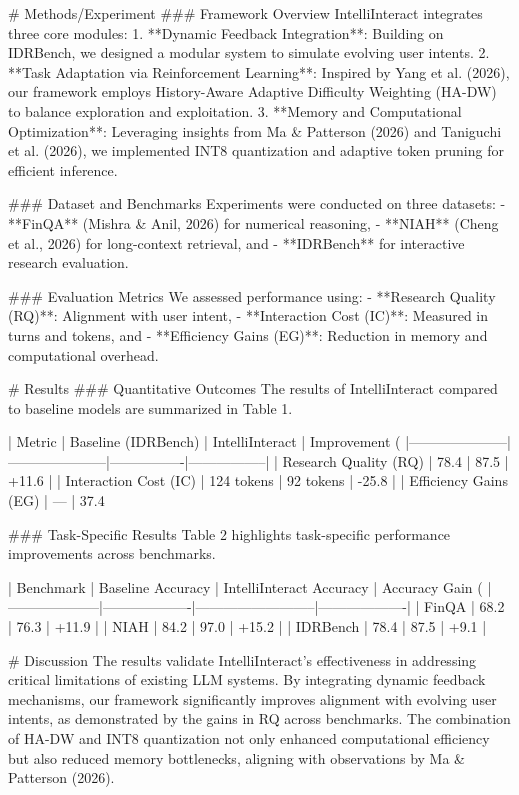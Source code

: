 # Methods/Experiment  
### Framework Overview  
IntelliInteract integrates three core modules:  
1. **Dynamic Feedback Integration**: Building on IDRBench, we designed a modular system to simulate evolving user intents.  
2. **Task Adaptation via Reinforcement Learning**: Inspired by Yang et al. (2026), our framework employs History-Aware Adaptive Difficulty Weighting (HA-DW) to balance exploration and exploitation.  
3. **Memory and Computational Optimization**: Leveraging insights from Ma & Patterson (2026) and Taniguchi et al. (2026), we implemented INT8 quantization and adaptive token pruning for efficient inference.

### Dataset and Benchmarks  
Experiments were conducted on three datasets:  
- **FinQA** (Mishra & Anil, 2026) for numerical reasoning,  
- **NIAH** (Cheng et al., 2026) for long-context retrieval, and  
- **IDRBench** for interactive research evaluation.

### Evaluation Metrics  
We assessed performance using:  
- **Research Quality (RQ)**: Alignment with user intent,  
- **Interaction Cost (IC)**: Measured in turns and tokens, and  
- **Efficiency Gains (EG)**: Reduction in memory and computational overhead.

# Results  
### Quantitative Outcomes  
The results of IntelliInteract compared to baseline models are summarized in Table 1.

| Metric              | Baseline (IDRBench) | IntelliInteract | Improvement (%
|---------------------|---------------------|----------------|-----------------|
| Research Quality (RQ) | 78.4               | 87.5           | +11.6           |
| Interaction Cost (IC) | 124 tokens         | 92 tokens      | -25.8           |
| Efficiency Gains (EG) | —                 | 37.4%

### Task-Specific Results  
Table 2 highlights task-specific performance improvements across benchmarks.

| Benchmark         | Baseline Accuracy | IntelliInteract Accuracy | Accuracy Gain (%
|--------------------|-------------------|--------------------------|-------------------|
| FinQA             | 68.2              | 76.3                     | +11.9             |
| NIAH              | 84.2              | 97.0                     | +15.2             |
| IDRBench          | 78.4              | 87.5                     | +9.1              |

# Discussion  
The results validate IntelliInteract's effectiveness in addressing critical limitations of existing LLM systems. By integrating dynamic feedback mechanisms, our framework significantly improves alignment with evolving user intents, as demonstrated by the gains in RQ across benchmarks. The combination of HA-DW and INT8 quantization not only enhanced computational efficiency but also reduced memory bottlenecks, aligning with observations by Ma & Patterson (2026).

